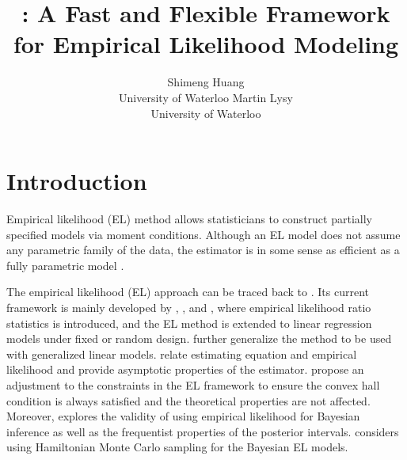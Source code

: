\documentclass[article]{jss}
\author{
Shimeng Huang\\University of Waterloo \And Martin Lysy\\University of Waterloo
}
\title{\pkg{flexEL}: A Fast and Flexible Framework for Empirical Likelihood Modeling}
\renewcommand{\|}{\,|\,}
\begin{document}
\maketitle

% 
\hypertarget{introduction}{%
\section{Introduction}\label{introduction}}

Empirical likelihood (EL) method allows statisticians to construct partially specified models via moment conditions. Although an EL model does not assume any parametric family of the data, the estimator is in some sense as efficient as a fully parametric model \citep{qin-lawless1994}.

The empirical likelihood (EL) approach can be traced back to \citet{thomas-grunkemeier1975}. Its current framework is mainly developed by \citet{owen1988}, \citet{owen1990}, and \citet{owen1991}, where empirical likelihood ratio statistics is introduced, and the EL method is extended to linear regression models under fixed or random design. \citet{kolaczyk1994} further generalize the method to be used with generalized linear models. \citet{qin-lawless1994} relate estimating equation and empirical likelihood and provide asymptotic properties of the estimator. \citet{chen-et-al2008} propose an adjustment to the constraints in the EL framework to ensure the convex hall condition is always satisfied and the theoretical properties are not affected. Moreover, \citet{lazar2003} explores the validity of using empirical likelihood for Bayesian inference as well as the frequentist properties of the posterior intervals. \citet{chaudhuri-et-al2017} considers using Hamiltonian Monte Carlo sampling for the Bayesian EL models.
\end{document}
